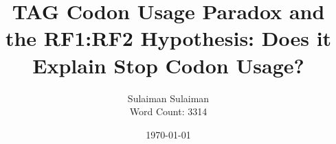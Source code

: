 \documentclass[
    emulatestandardclasses,
    parskip=half,
]{scrartcl}
\begin{document}
    \title{TAG Codon Usage Paradox and the RF1:RF2 Hypothesis: Does it Explain Stop Codon Usage?}
    \date{\today}
    \author{Sulaiman Sulaiman \\ Word Count: 3314}
    \maketitle

    
    

    \pagebreak
    
    
    \pagebreak

	\newpage {}
    \newrefcontext[sorting=nyt]
    \nocite{anaconda,SciPy,NumPy,pandas,biopython,statsmodels,matplotlib,R,tidyverse,ggrepel,tqdm,gffutils}
	\printbibliography[notkeyword=software]
	\printbibliography[keyword=software, title={Software \& Libraries}]
\end{document}
